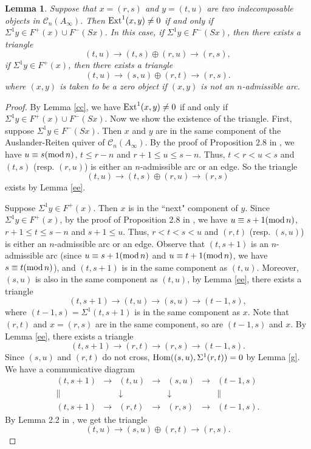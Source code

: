 \documentclass[a4paper,reqno,11pt]{amsart}
\newtheorem{lemma}[theorem]{Lemma}
\theoremstyle{definition}
\def\C{\mathcal{C}}
\providecommand{\Ext}{\mathop{\rm Ext}\nolimits}%
\providecommand{\Hom}{\mathop{\rm Hom}\nolimits}%
\renewcommand{\mod}{\mathop{\rm mod}\nolimits}%
\begin{document}
\begin{lemma}\label{hh}
Suppose that $x=(r,s)$ and $y=(t,u)$ are two indecomposable objects in $\C_n(A_{\infty})$. Then
$\Ext^1(x,y)\neq 0$ if and only if $\Sigma^1 y\in F^{+}(x)\cup F^{-}(Sx)$. In this case, if $\Sigma^1 y\in F^{-}(Sx)$, then there exists a triangle
$$(t,u)\rightarrow(t,s)\oplus(r,u)\rightarrow(r,s),$$
if $\Sigma^1 y\in F^{+}(x)$, then there exists a triangle
$$(t,u)\rightarrow(s,u)\oplus(r,t)\rightarrow(r,s).$$
where $(x,y)$ is taken to be a zero object if $(x,y)$ is not an $n$-admissible arc.
\end{lemma}
\begin{proof}
By Lemma \ref{cc}, we have $\Ext^1(x,y)\neq 0$ if and only if $\Sigma^1 y\in F^{+}(x)\cup F^{-}(Sx)$. Now we show the existence of the triangle. First, suppose $\Sigma^1 y\in F^{-}(Sx)$. Then $x$ and $y$ are in the same component of the Auslander-Reiten quiver of $\C_n(A_{\infty})$. By the proof of Proposition 2.8 in \cite{HJ1}, we have $u\equiv s(\mod n)$, $t\leq r-n$ and $r+1\leq u\leq s-n$. Thus, $t<r<u<s$ and $(t,s)$ (resp. $(r,u)$) is either an $n$-admissible arc or an edge. So the triangle
$$(t,u)\rightarrow(t,s)\oplus(r,u)\rightarrow(r,s)$$
exists by Lemma \ref{ee}.

Suppose $\Sigma^1 y\in F^{+}(x)$. Then $x$ is in the ``next" component of $y$. Since $\Sigma^1 y\in F^{+}(x)$, by the proof of Proposition 2.8 in \cite{HJ1}, we have $u\equiv s+1(\mod n)$, $r+1\leq t \leq s-n$ and $s+1\leq u$. Thus, $r<t<s<u$ and $(r,t)$ (resp. $(s,u)$) is either an $n$-admissible arc or an edge. Observe that $(t,s+1)$ is an $n$-admissible arc (since $u\equiv s+1(\mod n)$ and $u\equiv t+1(\mod n)$, we have $s\equiv t(\mod n)$), and $(t,s+1)$ is in the same component as $(t,u)$. Moreover, $(s,u)$ is also in the same component as $(t,u)$, by Lemma \ref{ee}, there exists a  triangle
$$(t,s+1)\rightarrow(t,u)\rightarrow(s,u)\rightarrow(t-1,s),$$
where $(t-1,s)=\Sigma^1 (t,s+1)$ is in the same component as $x$. Note that $(r,t)$ and $x=(r,s)$ are in the same component, so are $(t-1,s)$ and $x$. By Lemma \ref{ee}, there exists a  triangle
$$(t,s+1)\rightarrow(r,t)\rightarrow(r,s)\rightarrow(t-1,s).$$
Since  $(s,u)$ and $(r,t)$ do not cross, $\Hom((s,u),\Sigma^1(r,t))=0$ by Lemma \ref{g}. We have a communicative diagram
$$\begin{array}{ccccccc}
(t,s+1)&\rightarrow&(t,u)&\rightarrow&(s,u)&\rightarrow&(t-1,s)\\
\parallel&&\downarrow &&\downarrow&&\parallel\\
(t,s+1)&\rightarrow&(r,t)&\rightarrow&(r,s)&\rightarrow&(t-1,s).
\end{array}$$
By Lemma 2.2 in \cite{XZ}, we get the triangle
$$(t,u)\rightarrow(s,u)\oplus(r,t)\rightarrow(r,s).$$
\end{proof}
\end{document}
